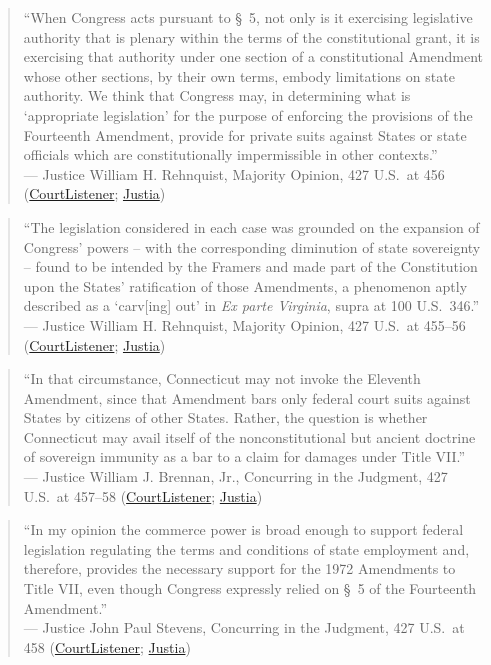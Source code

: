 \documentclass[12pt]{article}
\begin{document}
\begin{quote}
``When Congress acts pursuant to \S~5, not only is it exercising legislative authority that is plenary within the terms of the constitutional grant, it is exercising that authority under one section of a constitutional Amendment whose other sections, by their own terms, embody limitations on state authority. We think that Congress may, in determining what is `appropriate legislation' for the purpose of enforcing the provisions of the Fourteenth Amendment, provide for private suits against States or state officials which are constitutionally impermissible in other contexts.''\\
--- Justice William H. Rehnquist, Majority Opinion, 427 U.S.\ at 456 (\href{https://www.courtlistener.com/opinion/109520/fitzpatrick-v-bitzer/}{CourtListener}; \href{https://supreme.justia.com/cases/federal/us/427/445/}{Justia})
\end{quote}

\begin{quote}
``The legislation considered in each case was grounded on the expansion of Congress' powers -- with the corresponding diminution of state sovereignty -- found to be intended by the Framers and made part of the Constitution upon the States' ratification of those Amendments, a phenomenon aptly described as a `carv[ing] out' in \textit{Ex parte Virginia}, supra at 100 U.S.\ 346.''\\
--- Justice William H. Rehnquist, Majority Opinion, 427 U.S.\ at 455--56 (\href{https://www.courtlistener.com/opinion/109520/fitzpatrick-v-bitzer/}{CourtListener}; \href{https://supreme.justia.com/cases/federal/us/427/445/}{Justia})
\end{quote}

\begin{quote}
``In that circumstance, Connecticut may not invoke the Eleventh Amendment, since that Amendment bars only federal court suits against States by citizens of other States. Rather, the question is whether Connecticut may avail itself of the nonconstitutional but ancient doctrine of sovereign immunity as a bar to a claim for damages under Title VII.''\\
--- Justice William J. Brennan, Jr., Concurring in the Judgment, 427 U.S.\ at 457--58 (\href{https://www.courtlistener.com/opinion/109520/fitzpatrick-v-bitzer/}{CourtListener}; \href{https://supreme.justia.com/cases/federal/us/427/445/}{Justia})
\end{quote}

\begin{quote}
``In my opinion the commerce power is broad enough to support federal legislation regulating the terms and conditions of state employment and, therefore, provides the necessary support for the 1972 Amendments to Title VII, even though Congress expressly relied on \S~5 of the Fourteenth Amendment.''\\
--- Justice John Paul Stevens, Concurring in the Judgment, 427 U.S.\ at 458 (\href{https://www.courtlistener.com/opinion/109520/fitzpatrick-v-bitzer/}{CourtListener}; \href{https://supreme.justia.com/cases/federal/us/427/445/}{Justia})
\end{quote}
\end{document}

